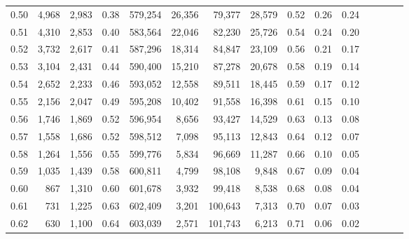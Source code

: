 \begin{tabular}{rrrcrrrrrrrrrrr}
0.50 &   4,968 &  2,983 &                                       0.38 &  579,254 &   26,356 &   79,377 &   28,579 &  0.52 &  0.26 &                         0.24 \\
0.51 &   4,310 &  2,853 &                                       0.40 &  583,564 &   22,046 &   82,230 &   25,726 &  0.54 &  0.24 &                         0.20 \\
0.52 &   3,732 &  2,617 &                                       0.41 &  587,296 &   18,314 &   84,847 &   23,109 &  0.56 &  0.21 &                         0.17 \\
0.53 &   3,104 &  2,431 &                                       0.44 &  590,400 &   15,210 &   87,278 &   20,678 &  0.58 &  0.19 &                         0.14 \\
0.54 &   2,652 &  2,233 &                                       0.46 &  593,052 &   12,558 &   89,511 &   18,445 &  0.59 &  0.17 &                         0.12 \\
0.55 &   2,156 &  2,047 &                                       0.49 &  595,208 &   10,402 &   91,558 &   16,398 &  0.61 &  0.15 &                         0.10 \\
0.56 &   1,746 &  1,869 &                                       0.52 &  596,954 &    8,656 &   93,427 &   14,529 &  0.63 &  0.13 &                         0.08 \\
0.57 &   1,558 &  1,686 &                                       0.52 &  598,512 &    7,098 &   95,113 &   12,843 &  0.64 &  0.12 &                         0.07 \\
0.58 &   1,264 &  1,556 &                                       0.55 &  599,776 &    5,834 &   96,669 &   11,287 &  0.66 &  0.10 &                         0.05 \\
0.59 &   1,035 &  1,439 &                                       0.58 &  600,811 &    4,799 &   98,108 &    9,848 &  0.67 &  0.09 &                         0.04 \\
0.60 &     867 &  1,310 &                                       0.60 &  601,678 &    3,932 &   99,418 &    8,538 &  0.68 &  0.08 &                         0.04 \\
0.61 &     731 &  1,225 &                                       0.63 &  602,409 &    3,201 &  100,643 &    7,313 &  0.70 &  0.07 &                         0.03 \\
0.62 &     630 &  1,100 &                                       0.64 &  603,039 &    2,571 &  101,743 &    6,213 &  0.71 &  0.06 &                         0.02 \\

\end{tabular}
